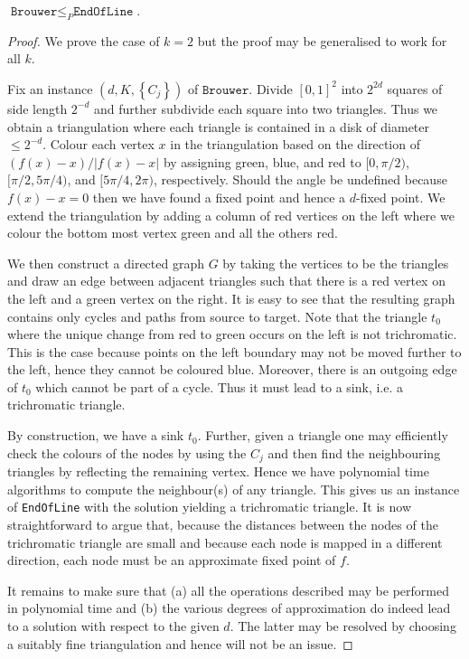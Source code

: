 \documentclass{article}
\begin{document}
\begin{theorem}
  $\texttt{Brouwer}\leq_P\texttt{EndOfLine}$.
  \begin{proof}
    We prove the case of $k=2$ but the proof may be generalised to
    work for all $k$.

    Fix an instance $(d,K,\left\lbrace{C_j}\right\rbrace)$ of $\texttt{Brouwer}$.
    Divide $[0,1]^2$ into $2^{2d}$ squares of side length $2^{-d}$ and
    further subdivide each square into two triangles. Thus we obtain
    a triangulation where each triangle is contained in a disk of
    diameter $\leq 2^{-d}$.
    Colour each vertex $x$ in the triangulation based on the direction of
    $(f(x)-x)/|f(x)-x|$ by assigning green, blue, and red to $[0,\pi/2)$, $[\pi/2,5\pi/4)$, and $[5\pi/4,2\pi)$, respectively.
    Should the angle be undefined because $f(x)-x=0$ then we have
    found a fixed point and hence a $d$-fixed point.
    We extend the triangulation by adding a column of red vertices on the
    left where we colour the bottom most vertex green and all the others
    red.

    We then construct a directed graph $G$ by taking the vertices to be the triangles
    and draw an edge between adjacent triangles such that there is
    a red vertex on the left and a green vertex on the right.
    It is
    easy to see that the resulting graph contains only cycles
    and paths from source to target. Note that the triangle $t_0$ where
    the unique change from red to green occurs on the left is not
    trichromatic. This is the case because points on the left
    boundary may not be moved further to the left, hence they cannot
    be coloured blue. Moreover, there is an outgoing edge of $t_0$
    which cannot be part of a cycle. Thus it must lead to
    a sink, i.e. a trichromatic triangle.

    By construction, we have a sink $t_0$. Further, given a triangle one
    may efficiently check the colours of the nodes by using the $C_j$
    and then find the neighbouring triangles by reflecting the
    remaining vertex.
    Hence we have polynomial time algorithms to compute the neighbour(s)
    of any triangle. This gives us an instance of \texttt{EndOfLine} with the solution yielding
    a trichromatic triangle.
    It is now straightforward to argue
    that, because the distances between the nodes of the trichromatic
    triangle are small and because each node is mapped in a different
    direction, each node must be an approximate fixed point of $f$.

    It remains to make sure that (a) all the operations described
    may be performed in polynomial time and (b) the various degrees
    of approximation do indeed lead to a solution with respect to the
    given $d$. The latter may be resolved by choosing a suitably
    fine triangulation and hence will not be an issue.
  \end{proof}
\end{theorem}
\end{document}
